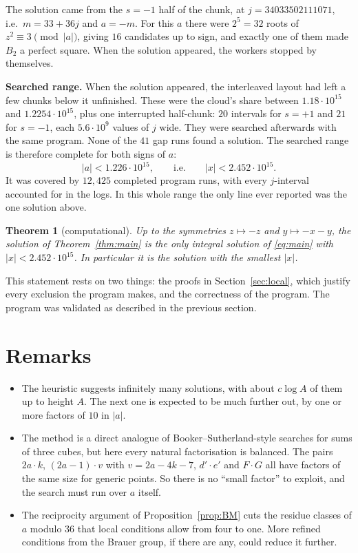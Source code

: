 \documentclass[11pt]{article}
\newtheorem{theorem}{Theorem}
\theoremstyle{remark}
\theoremstyle{definition}
\begin{document}
The solution came from the $s=-1$ half of the chunk, at $j=34033502111071$, i.e.\ $m=33+36j$ and
$a=-m$.  For this $a$ there were $2^5=32$ roots of $z^2\equiv3\pmod{|a|}$, giving $16$ candidates up
to sign, and exactly one of them made $B_2$ a perfect square.  When the solution appeared, the
workers stopped by themselves.

\textbf{Searched range.}  When the solution appeared, the interleaved layout had left a few chunks
below it unfinished.  These were the cloud's share between $1.18\cdot10^{15}$ and $1.2254\cdot10^{15}$,
plus one interrupted half-chunk: $20$ intervals for $s=+1$ and $21$ for $s=-1$, each $5.6\cdot10^9$
values of $j$ wide.  They were searched afterwards with the same program.
None of the $41$ gap runs found a solution.  The searched range is therefore
complete for both signs of $a$:
\[
|a|<1.226\cdot10^{15},\qquad\text{i.e.}\qquad |x|<2.452\cdot10^{15}.
\]
It was covered by $12{,}425$ completed program runs, with every $j$-interval accounted for in the
logs.  In this whole range the only line ever reported was the one solution above.

\begin{theorem}[computational]\label{thm:unique}
Up to the symmetries $z\mapsto-z$ and $y\mapsto -x-y$, the solution of Theorem~\ref{thm:main} is the
only integral solution of \eqref{eq:main} with $|x|<2.452\cdot10^{15}$.  In particular it is the
solution with the smallest $|x|$.
\end{theorem}

\noindent This statement rests on two things: the proofs in Section~\ref{sec:local}, which justify
every exclusion the program makes, and the correctness of the program.  The program was validated
as described in the previous section.

\section{Remarks}
\begin{itemize}
\item The heuristic suggests infinitely many solutions, with about $c\log A$ of them up to height
  $A$.  The next one is expected to be much further out, by one or more factors of $10$ in $|a|$.
\item The method is a direct analogue of Booker--Sutherland-style searches for sums of three cubes,
  but here every natural factorisation is balanced.  The pairs $2a\cdot k$, $(2a-1)\cdot v$ with
  $v=2a-4k-7$, $d'\cdot e'$ and $F\cdot G$ all have factors of the same size for generic points.
  So there is no ``small factor'' to exploit, and the search must run over $a$ itself.
\item The reciprocity argument of Proposition~\ref{prop:BM} cuts the residue classes of $a$ modulo $36$
  that local conditions allow from four to one.  More refined conditions from the Brauer group, if there are
  any, could reduce it further.
\end{itemize}
\end{document}
